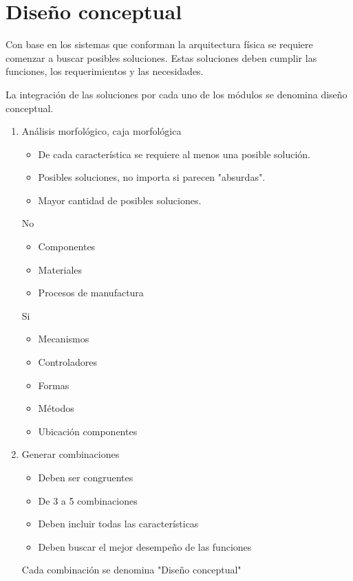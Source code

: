 \section{Diseño conceptual}
Con base en los sistemas que conforman la arquitectura física se requiere comenzar a buscar posibles soluciones. Estas soluciones deben cumplir las funciones, los requerimientos y las necesidades.

La integración de las soluciones por cada uno de los módulos se denomina diseño conceptual.

\begin{enumerate}
    \item Análisis morfológico, caja morfológica
        \begin{itemize}
            \item De cada característica se requiere al menos una posible solución. 
            \item Posibles soluciones, no importa si parecen "absurdas".
            \item Mayor cantidad de posibles soluciones.
            
        \end{itemize}
        
        No
        \begin{itemize}
            \item Componentes
            \item Materiales
            \item Procesos de manufactura
        \end{itemize}
        
        Si
        \begin{itemize}
            \item Mecanismos 
            \item Controladores
            \item Formas
            \item Métodos
            \item Ubicación componentes 
        \end{itemize}
        
        \item Generar combinaciones
        \begin{itemize}
            \item Deben ser congruentes
            \item De 3 a 5 combinaciones
            \item Deben incluir todas las características
            \item Deben buscar el mejor desempeño de las funciones
        \end{itemize}
        Cada combinación se denomina "Diseño conceptual"
        

\end{enumerate}
